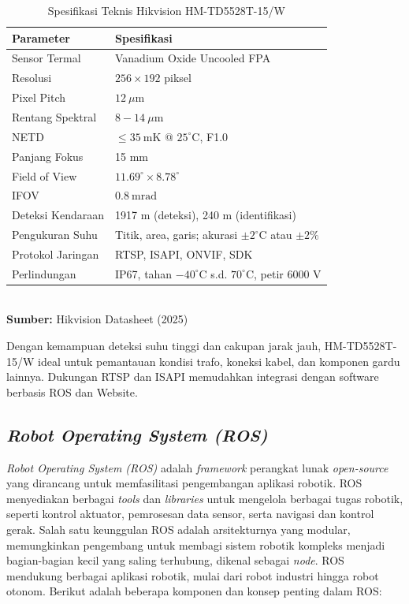 \begin{table}[H]
    \centering
    \caption{Spesifikasi Teknis Hikvision HM-TD5528T-15/W}
    \label{tab:spesifikasiHikvision}
    \renewcommand{\arraystretch}{1.2}
    \begin{tabular}{|p{6cm}|p{7.5cm}|}
        \hline
        \textbf{Parameter} & \textbf{Spesifikasi} \\
        \hline
        Sensor Termal & Vanadium Oxide Uncooled FPA \\
        \hline
        Resolusi & \(256 \times 192\) piksel \\
        \hline
        Pixel Pitch & \(12~\mu\mathrm{m}\) \\
        \hline
        Rentang Spektral & \(8 - 14~\mu\mathrm{m}\) \\
        \hline
        NETD & \(\leq 35~\text{mK}\) @ \(25^\circ\text{C}\), F1.0 \\
        \hline
        Panjang Fokus & 15 mm \\
        \hline
        Field of View & \(11.69^\circ \times 8.78^\circ\) \\
        \hline
        IFOV & \(0.8~\text{mrad}\) \\
        \hline
        Deteksi Kendaraan & 1917 m (deteksi), 240 m (identifikasi) \\
        \hline
        Pengukuran Suhu & Titik, area, garis; akurasi \(\pm 2^\circ\text{C}\) atau \(\pm 2\%\) \\
        \hline
        Protokol Jaringan & RTSP, ISAPI, ONVIF, SDK \\
        \hline
        Perlindungan & IP67, tahan \(-40^\circ\text{C}\) s.d. \(70^\circ\text{C}\), petir 6000 V \\
        \hline
    \end{tabular}
    \footnotesize\\ \textbf{Sumber:} Hikvision Datasheet (2025)
\end{table}

Dengan kemampuan deteksi suhu tinggi dan cakupan jarak jauh, HM-TD5528T-15/W ideal untuk pemantauan kondisi trafo, koneksi kabel, dan komponen gardu lainnya. Dukungan RTSP dan ISAPI memudahkan integrasi dengan software berbasis ROS dan Website. 

\subsection{\emph{Robot Operating System (ROS)}}
\emph{Robot Operating System (ROS)} adalah \emph{framework} perangkat lunak \emph{open-source} yang dirancang untuk memfasilitasi pengembangan aplikasi robotik. ROS menyediakan berbagai \emph{tools} dan \emph{libraries} untuk mengelola berbagai tugas robotik, seperti kontrol aktuator, pemrosesan data sensor, serta navigasi dan kontrol gerak. Salah satu keunggulan ROS adalah arsitekturnya yang modular, memungkinkan pengembang untuk membagi sistem robotik kompleks menjadi bagian-bagian kecil yang saling terhubung, dikenal sebagai \emph{node}. ROS mendukung berbagai aplikasi robotik, mulai dari robot industri hingga robot otonom. Berikut adalah beberapa komponen dan konsep penting dalam ROS:

